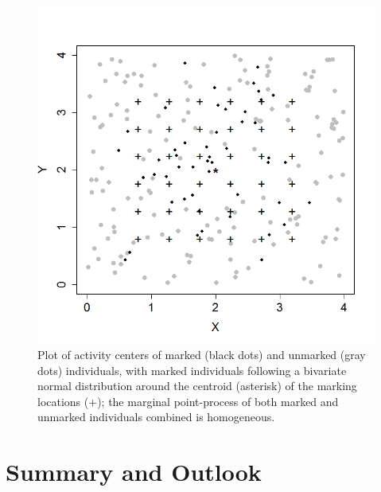\begin{figure}[htp]
\begin{center}
\includegraphics[width=5in]{Ch19-PartialID/figs/scrPIDhn.png}
\end{center}
\caption{
Plot of activity centers of marked (black dots) and unmarked (gray dots) individuals, with marked individuals following a bivariate normal distribution around the centroid (asterisk) of the marking locations (+); the marginal point-process of both marked and unmarked individuals combined is homogeneous.
}
\label{partialID.fig.hn}
\end{figure}




\section{Summary and Outlook}

